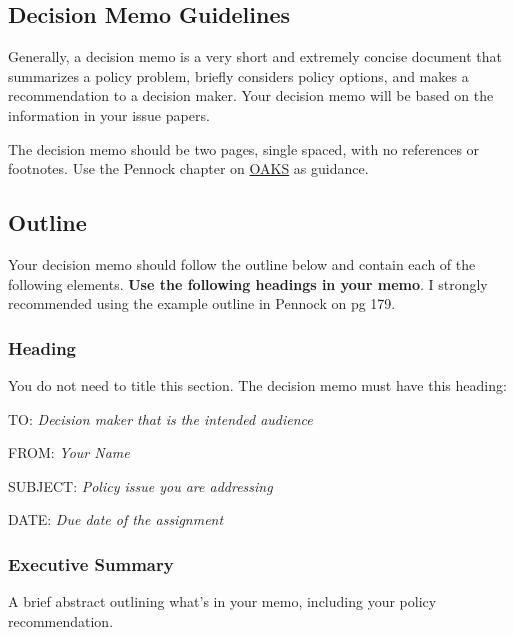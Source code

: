 \hypertarget{decision-memo-guidelines}{%
\subsection{Decision Memo Guidelines}\label{decision-memo-guidelines}}

Generally, a decision memo is a very short and extremely concise
document that summarizes a policy problem, briefly considers policy
options, and makes a recommendation to a decision maker. Your decision
memo will be based on the information in your issue papers.

\vspace{0.1in}
\noindent The decision memo should be two pages, single spaced, with no
references or footnotes. Use the Pennock chapter on
\href{https://lms.cofc.edu/d2l/home}{OAKS} as guidance.

\hypertarget{outline}{%
\subsection{Outline}\label{outline}}

Your decision memo should follow the outline below and contain each of
the following elements. \textbf{Use the following headings in your
memo}. I strongly recommended using the example outline in Pennock on pg
179.

\hypertarget{heading}{%
\subsubsection{Heading}\label{heading}}

You do not need to title this section. The decision memo must have this
heading:

\vspace{0.1in}
TO: \emph{Decision maker that is the intended audience}

FROM: \emph{Your Name}

SUBJECT: \emph{Policy issue you are addressing}

DATE: \emph{Due date of the assignment}

\hypertarget{executive-summary}{%
\subsubsection{Executive Summary}\label{executive-summary}}

A brief abstract outlining what's in your memo, including your policy
recommendation.


